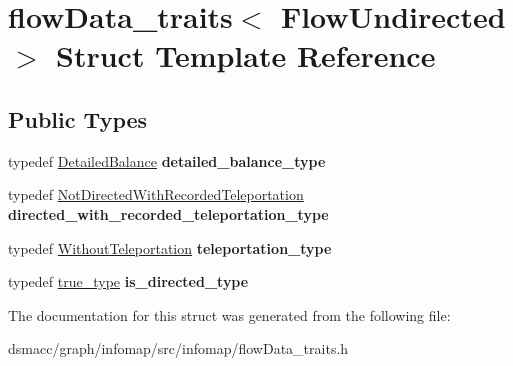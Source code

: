 \hypertarget{structflowData__traits_3_01FlowUndirected_01_4}{}\section{flow\+Data\+\_\+traits$<$ Flow\+Undirected $>$ Struct Template Reference}
\label{structflowData__traits_3_01FlowUndirected_01_4}
\subsection*{Public Types}
\begin{DoxyCompactItemize}
\item 
\mbox{\label{structflowData__traits_3_01FlowUndirected_01_4_a464d17a51142210057e88a037acfad19}} 
typedef \mbox{\hyperlink{structDetailedBalance}{Detailed\+Balance}} {\bfseries detailed\+\_\+balance\+\_\+type}
\item 
\mbox{\label{structflowData__traits_3_01FlowUndirected_01_4_a677f609de65bf7211b748f2f67837395}} 
typedef \mbox{\hyperlink{structNotDirectedWithRecordedTeleportation}{Not\+Directed\+With\+Recorded\+Teleportation}} {\bfseries directed\+\_\+with\+\_\+recorded\+\_\+teleportation\+\_\+type}
\item 
\mbox{\label{structflowData__traits_3_01FlowUndirected_01_4_a03daa28b280476e34ee24d2518ca6bd6}} 
typedef \mbox{\hyperlink{structWithoutTeleportation}{Without\+Teleportation}} {\bfseries teleportation\+\_\+type}
\item 
\mbox{\label{structflowData__traits_3_01FlowUndirected_01_4_a0933a1b228b7899da868d46eac5ac045}} 
typedef \mbox{\hyperlink{structtrue__type}{true\+\_\+type}} {\bfseries is\+\_\+directed\+\_\+type}
\end{DoxyCompactItemize}


The documentation for this struct was generated from the following file\+:\begin{DoxyCompactItemize}
\item 
dsmacc/graph/infomap/src/infomap/flow\+Data\+\_\+traits.\+h\end{DoxyCompactItemize}
